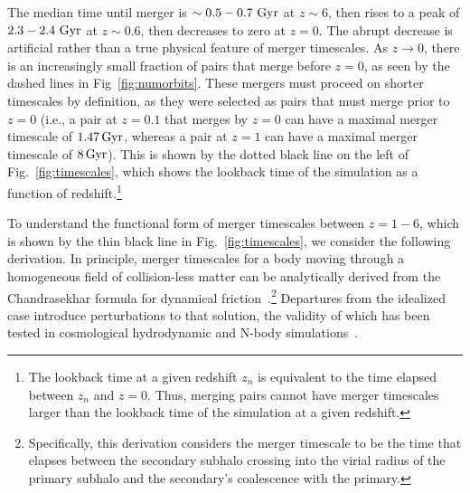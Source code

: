 \documentclass[twocolumn,linenumbers]{aastex631}
\begin{document}
        The median time until merger is $\sim0.5-0.7\,\mathrm{\,Gyr}$ at $z\sim6$, then rises to a peak of $2.3-2.4\,\mathrm{\,Gyr}$ at $z\sim0.6$, then decreases to zero at $z=0$.
        The abrupt decrease is artificial rather than a true physical feature of merger timescales. 
        As $z\to0$, there is an increasingly small fraction of pairs that merge before $z=0$, as seen by the dashed lines in Fig~\ref{fig:numorbits}. 
        These mergers must proceed on shorter timescales by definition, as they were selected as pairs that must merge prior to $z=0$ (i.e., a pair at $z=0.1$ that merges by $z=0$ can have a maximal merger timescale of $1.47\mathrm{\,Gyr}$, whereas a pair at $z=1$ can have a maximal merger timescale of $8\mathrm{\,Gyr}$). 
        This is shown by the dotted black line on the left of Fig.~\ref{fig:timescales}, which shows the lookback time of the simulation as a function of redshift.\footnote{The lookback time at a given redshift $z_n$ is equivalent to the time elapsed between $z_n$ and $z=0$. Thus, merging pairs cannot have merger timescales larger than the lookback time of the simulation at a given redshift.} 

        To understand the functional form of merger timescales between $z=1-6$, which is shown by the thin black line in Fig.~\ref{fig:timescales}, we consider the following derivation. 
        In principle, merger timescales for a body moving through a homogeneous field of collision-less matter can be analytically derived from the Chandrasekhar formula for dynamical friction~\citep{Binney2008}.\footnote{Specifically, this derivation considers the merger timescale to be the time that elapses between the secondary subhalo crossing into the virial radius of the primary subhalo and the secondary's coalescence with the primary.} 
        Departures from the idealized case introduce perturbations to that solution, the validity of which has been tested in cosmological hydrodynamic and N-body simulations~\citep{Jiang2008, BoylanKolchin2008}. 
\end{document}
